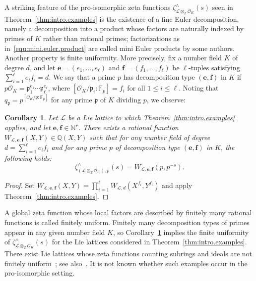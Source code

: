 \documentclass[11pt,a4paper]{amsart}
\theoremstyle{plain}
\newtheorem{cor}[thm]{Corollary}
\theoremstyle{remark}
\newcommand{\N}{\mathbb{N}}
\newcommand{\Z}{\mathbb{Z}}
\newcommand{\Q}{\mathbb{Q}}
\newcommand{\tensor}{\otimes}
\newcommand{\p}{\mathfrak{p}}
\newcommand{\npr}{\ell}
\def \p {\ensuremath{\mathfrak{p}}}
\begin{document}
A striking feature of the pro-isomorphic zeta functions $\zeta^\wedge_{\mathcal{L} \tensor_\Z \mathcal{O}_K}(s)$ seen in Theorem~\ref{thm:intro.examples} is the existence of a fine Euler decomposition, namely a decomposition into a product whose factors are naturally indexed by primes of $K$ rather than rational primes; factorizations as in~\eqref{equ:mini.euler.product} are called mini Euler products by some authors.  Another property is finite uniformity.  More precisely, fix a number field $K$ of degree $d$, and let $\mathbf{e} = (e_1, \dots, e_\npr)$ and $\mathbf{f} = (f_1, \dots, f_\npr)$ be $\npr$-tuples satisfying $\sum_{i = 1}^\npr e_i f_i = d$.  We say that a prime $p$ has decomposition type $(\mathbf{e}, \mathbf{f})$ in $K$ if $p \mathcal{O}_K = \p_1^{e_1} \cdots \p_\npr^{e_\npr}$, where $[ \mathcal{O}_K / \p_i : \mathbb{F}_p] = f_i$ for all $1 \leq i \leq \npr$.  Noting that $q_\p = p^{[ \mathcal{O}_K / \p : \mathbb{F}_p]}$ for any prime $\p$ of $K$ dividing $p$, we observe:
\begin{cor} \label{cor:finitely.uniform}
Let $\mathcal{L}$ be a Lie lattice to which Theorem~\ref{thm:intro.examples} applies, and let $\mathbf{e}, \mathbf{f} \in \N^r$.  There exists a rational function $W_{\mathcal{L}, \mathbf{e}, \mathbf{f}}(X,Y) \in \Q(X,Y)$ such that for any number field of degree $d = \sum_{i = 1}^\npr e_i f_i$ and for any prime $p$ of decomposition type $(\mathbf{e}, \mathbf{f})$ in $K$, the following holds:
$$ \zeta^\wedge_{(\mathcal{L} \tensor_\Z \mathcal{O}_K),p}(s) = W_{\mathcal{L}, \mathbf{e}, \mathbf{f}}(p, p^{-s}).$$
\end{cor}
\begin{proof}
Set $W_{\mathcal{L}, \mathbf{e}, \mathbf{f}}(X,Y) = \prod_{i = 1}^\npr W_{\mathcal{L},d}(X^{f_i},Y^{f_i})$ and apply Theorem~\ref{thm:intro.examples}.
\end{proof}
A global zeta function whose local factors are described by finitely many rational functions is called finitely uniform.  Finitely many decomposition types of primes appear in any given number field $K$, so Corollary~\ref{cor:finitely.uniform} implies the finite uniformity of $\zeta^\wedge_{\mathcal{L} \tensor_\Z \mathcal{O}_K}(s)$ for the Lie lattices considered in Theorem~\ref{thm:intro.examples}.  There exist Lie lattices whose zeta functions counting subrings and ideals are not finitely uniform~\cite{duS-ecI/01}; see also~\cite{Voll/04}.  It is not known whether such examples occur in the pro-isomorphic setting.
\end{document}
